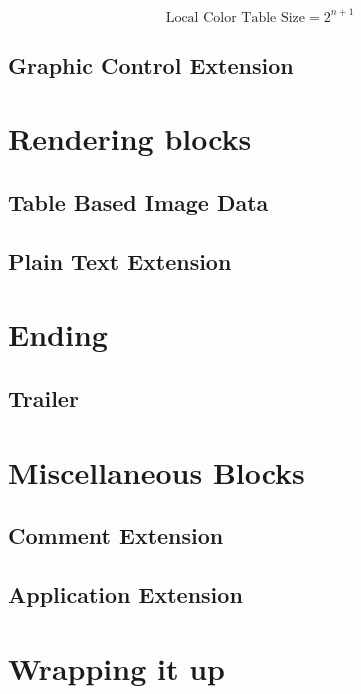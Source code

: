 \begin{refsection}
  \begin{equation*}
    \textrm{Local Color Table Size} = 2^{n + 1}
  \end{equation*}

  \subsection{Graphic Control Extension}

  

  \section{Rendering blocks}

  \subsection{Table Based Image Data}

  \subsection{Plain Text Extension}

  \section{Ending}

  \subsection{Trailer}

  \section{Miscellaneous Blocks}

  \subsection{Comment Extension}

  \subsection{Application Extension}

  \section{Wrapping it up}





  \printbibliography[heading=subbibliography]

\end{refsection}
